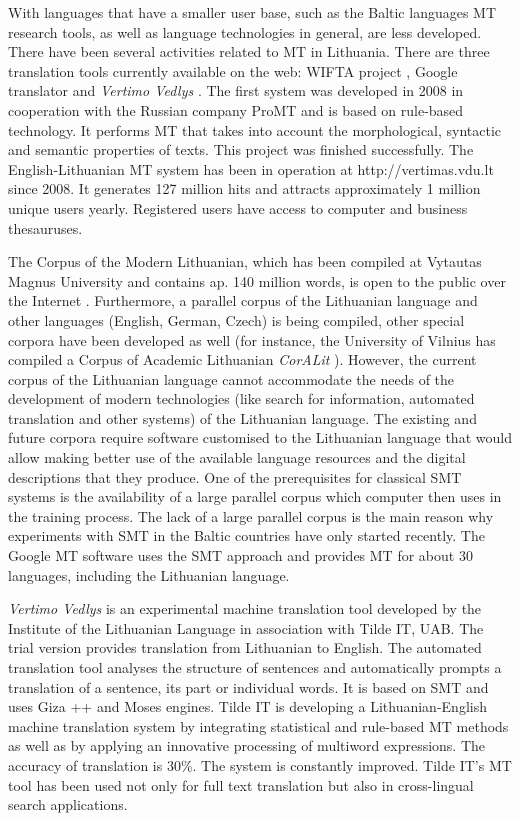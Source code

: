 \begin{multicols}{2}
    With languages that have a smaller user base, such as the Baltic languages MT research tools, as well as language technologies in general, are less developed. There have been several activities related to MT in Lithuania. There are three translation tools currently available on the web: WIFTA project \cite{vertvdu},  Google translator and \textit{Vertimo Vedlys} \cite{mvlab}.  The first system was developed in 2008 in cooperation with the Russian company ProMT and is based on rule-based technology. It performs MT that takes into account the morphological, syntactic and semantic properties of texts. This project was finished successfully. The English-Lithuanian MT system has been in operation at http://vertimas.vdu.lt since 2008. It generates 127 million hits and attracts approximately 1 million unique users yearly. Registered users have access to computer and business thesauruses.

    The Corpus of the Modern Lithuanian, which has been compiled at Vytautas Magnus University and contains ap. 140 million words, is open to the public over the Internet \cite{tekstynas}.  Furthermore, a parallel corpus of the Lithuanian language and other languages (English, German, Czech) is being compiled, other special corpora have been developed as well (for instance, the University of Vilnius has compiled a Corpus of Academic Lithuanian \textit{CorALit} \cite{coralit}). However, the current corpus of the Lithuanian language cannot accommodate the needs of the development of modern technologies (like search for information, automated translation and other systems) of the Lithuanian language. The existing and future corpora require software customised to the Lithuanian language that would allow making better use of the available language resources and the digital descriptions that they produce. One of the prerequisites for classical SMT systems is the  availability of a large parallel corpus which computer then uses in the training process. The lack of a large parallel corpus is the main reason why experiments with SMT in the Baltic countries have only started recently.  
    The Google MT software uses the SMT approach and provides MT for about 30 languages, including the Lithuanian language.

\textit{Vertimo Vedlys} is an experimental machine translation tool developed by the Institute of the Lithuanian Language in association with Tilde IT, UAB. The trial version provides translation from Lithuanian to English. The automated translation tool analyses the structure of sentences and automatically prompts a translation of a sentence, its part or individual words. It is based on SMT and uses Giza ++ and Moses engines. Tilde IT is developing a Lithuanian-English machine translation system by integrating statistical and rule-based MT methods as well as by applying an innovative processing of multiword expressions. The accuracy of translation is 30\%. The system is constantly improved. Tilde IT's MT tool has been used not only for full text translation but also in cross-lingual search applications.


\end{multicols}
